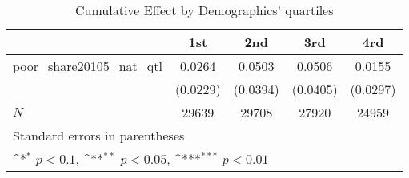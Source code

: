 \begin{table}[htbp]\centering
\def\sym#1{\ifmmode^{#1}\else\(^{#1}\)\fi}
\caption{Cumulative Effect by Demographics' quartiles}
\begin{tabular}{l*{4}{c}}
\hline\hline
            &\multicolumn{1}{c}{1st}&\multicolumn{1}{c}{2nd}&\multicolumn{1}{c}{3rd}&\multicolumn{1}{c}{4rd}\\
\hline
poor\_share20105\_nat\_qtl&      0.0264         &      0.0503         &      0.0506         &      0.0155         \\
            &    (0.0229)         &    (0.0394)         &    (0.0405)         &    (0.0297)         \\
\hline
\(N\)       &       29639         &       29708         &       27920         &       24959         \\
\hline\hline
\multicolumn{5}{l}{\footnotesize Standard errors in parentheses}\\
\multicolumn{5}{l}{\footnotesize \sym{*} \(p<0.1\), \sym{**} \(p<0.05\), \sym{***} \(p<0.01\)}\\
\end{tabular}
\end{table}
